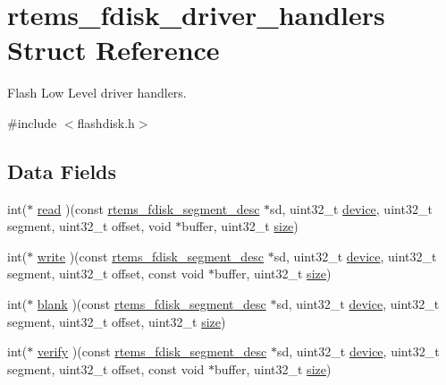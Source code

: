 \hypertarget{structrtems__fdisk__driver__handlers}{}\section{rtems\+\_\+fdisk\+\_\+driver\+\_\+handlers Struct Reference}
\label{structrtems__fdisk__driver__handlers}


Flash Low Level driver handlers.  




{\ttfamily \#include $<$flashdisk.\+h$>$}

\subsection*{Data Fields}
\begin{DoxyCompactItemize}
\item 
int($\ast$ \mbox{\hyperlink{structrtems__fdisk__driver__handlers_ad1c83b556560e58b379cd6faba061959}{read}} )(const \mbox{\hyperlink{structrtems__fdisk__segment__desc}{rtems\+\_\+fdisk\+\_\+segment\+\_\+desc}} $\ast$sd, uint32\+\_\+t \mbox{\hyperlink{structdevice}{device}}, uint32\+\_\+t segment, uint32\+\_\+t offset, void $\ast$buffer, uint32\+\_\+t \mbox{\hyperlink{sun4u_2tte_8h_a245260f6f74972558f61b85227df5aae}{size}})
\item 
int($\ast$ \mbox{\hyperlink{structrtems__fdisk__driver__handlers_a14430a22a8f1b7a9bfd9329c1041a809}{write}} )(const \mbox{\hyperlink{structrtems__fdisk__segment__desc}{rtems\+\_\+fdisk\+\_\+segment\+\_\+desc}} $\ast$sd, uint32\+\_\+t \mbox{\hyperlink{structdevice}{device}}, uint32\+\_\+t segment, uint32\+\_\+t offset, const void $\ast$buffer, uint32\+\_\+t \mbox{\hyperlink{sun4u_2tte_8h_a245260f6f74972558f61b85227df5aae}{size}})
\item 
int($\ast$ \mbox{\hyperlink{structrtems__fdisk__driver__handlers_afab24fd17437d920f877eb533fb849f3}{blank}} )(const \mbox{\hyperlink{structrtems__fdisk__segment__desc}{rtems\+\_\+fdisk\+\_\+segment\+\_\+desc}} $\ast$sd, uint32\+\_\+t \mbox{\hyperlink{structdevice}{device}}, uint32\+\_\+t segment, uint32\+\_\+t offset, uint32\+\_\+t \mbox{\hyperlink{sun4u_2tte_8h_a245260f6f74972558f61b85227df5aae}{size}})
\item 
int($\ast$ \mbox{\hyperlink{structrtems__fdisk__driver__handlers_a7ffca2062919a41fe49e06ee1058810f}{verify}} )(const \mbox{\hyperlink{structrtems__fdisk__segment__desc}{rtems\+\_\+fdisk\+\_\+segment\+\_\+desc}} $\ast$sd, uint32\+\_\+t \mbox{\hyperlink{structdevice}{device}}, uint32\+\_\+t segment, uint32\+\_\+t offset, const void $\ast$buffer, uint32\+\_\+t \mbox{\hyperlink{sun4u_2tte_8h_a245260f6f74972558f61b85227df5aae}{size}})

\end{DoxyCompactItemize}
